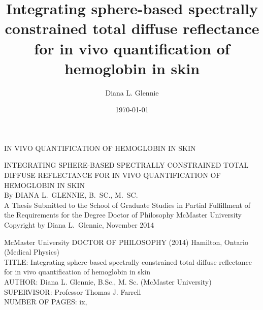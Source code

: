 \documentclass[letterpaper,12pt,twoside,openright]{report} %
\title{Integrating sphere-based spectrally constrained total diffuse reflectance for in vivo quantification of hemoglobin in skin}
\author{Diana L. Glennie}
\date{\today}
\begin{document}
\begin{titlepage} %
    \thispagestyle{empty}
    \vspace*{\fill}
    \begin{center}{\Large
    \uppercase{In vivo quantification of hemoglobin in skin}}
    \end{center}
    \vspace*{\fill}
    \setcounter{page}{0} %
\end{titlepage}

\begin{titlepage} %
\thispagestyle{empty}
\centering
\vspace*{\fill} %
{\Large \uppercase{Integrating sphere-based spectrally constrained total diffuse reflectance for in vivo quantification of hemoglobin in skin}\\
\vfill
By DIANA L.\ GLENNIE, B.\ SC., M.\ SC.\\}
\vfill
A Thesis Submitted to the School of Graduate Studies in Partial Fulfillment of
the Requirements for the Degree Doctor of Philosophy
\vfill%
McMaster University \textcopyright{} Copyright by Diana L.\ Glennie, November 2014
\end{titlepage}
{\noindent McMaster University DOCTOR OF PHILOSOPHY (2014) Hamilton, Ontario (Medical Physics)\\
TITLE: Integrating sphere-based spectrally constrained total diffuse reflectance for in vivo quantification of hemoglobin in skin\\
AUTHOR: Diana L. Glennie, B.Sc., M. Sc. (McMaster University)\\
SUPERVISOR: Professor Thomas J. Farrell\\
NUMBER OF PAGES: ix,~\pageref{LastPage}}
\end{document}
